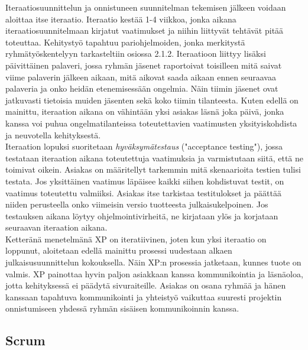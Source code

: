 \documentclass[finnish]{../tktltiki2}
\theoremstyle{definition}
\theoremstyle{remark}
\begin{document}
Iteraatiosuunnittelun ja onnistuneen suunnitelman tekemisen jälkeen voidaan aloittaa itse iteraatio. Iteraatio kestää 1-4 viikkoa, jonka aikana iteraatiosuunnitelmaan kirjatut vaatimukset ja niihin liittyvät tehtävät pitää toteuttaa. Kehitystyö tapahtuu pariohjelmoiden, jonka
merkitystä ryhmätyöskentelyyn tarkasteltiin osiossa 2.1.2. Iteraatioon liittyy lisäksi päivittäinen palaveri, jossa ryhmän jäsenet raportoivat toisilleen mitä saivat viime palaverin jälkeen aikaan, mitä aikovat saada aikaan ennen seuraavaa palaveria ja onko heidän etenemisessään ongelmia. Näin tiimin jäsenet ovat jatkuvasti tietoisia
muiden jäsenten sekä koko tiimin tilanteesta. Kuten edellä on mainittu, iteraation aikana on vähintään yksi asiakas läsnä joka päivä, jonka kanssa voi puhua ongelmatilanteissa toteutettavien vaatimusten yksityiskohdista ja neuvotella kehityksestä.\\

Iteraation lopuksi suoritetaan \emph{hyväksymätestaus} ("acceptance testing"), jossa testataan iteraation aikana toteutettuja vaatimuksia ja varmistutaan siitä, että ne toimivat oikein. Asiakas on määritellyt tarkemmin mitä skenaarioita testien tulisi testata. Jos yksittäinen vaatimus läpäisee kaikki siihen kohdistuvat testit, on vaatimus toteutettu valmiiksi. Asiakas itse tarkistaa testitulokset ja päättää niiden perusteella onko viimeisin versio tuotteesta julkaisukelpoinen. Jos testauksen aikana löytyy ohjelmointivirheitä, ne kirjataan ylös ja korjataan seuraavan iteraation aikana.\\

Ketteränä menetelmänä XP on iteratiivinen, joten kun yksi iteraatio on loppunut, aloitetaan edellä mainittu prosessi uudestaan alkaen julkaisusuunnittelun kokouksella. Näin XP:n prosessia jatketaan, kunnes tuote on valmis. XP painottaa hyvin paljon asiakkaan kanssa kommunikointia ja läsnäoloa, jotta kehityksessä ei päädytä sivuraiteille. Asiakas on osana ryhmää ja hänen kanssaan tapahtuva kommunikointi ja yhteistyö vaikuttaa suuresti projektin onnistumiseen yhdessä ryhmän sisäisen kommunikoinnin kanssa.

\subsection{Scrum}
\end{document}

